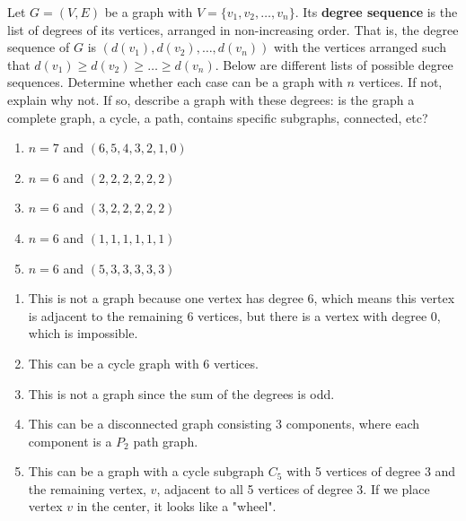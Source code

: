 \documentclass{article}
\theoremstyle{definition}
\begin{document}
\begin{question}
    Let $G=(V, E)$ be a graph with $V=\{v_1, v_2, \dots, v_n\}$. Its \textbf{degree sequence} is the list of degrees of its vertices, arranged in non-increasing order. That is, the degree sequence of $G$ is $(d(v_1), d(v_2), \dots, d(v_n))$ with the vertices arranged such that $d(v_1)\geq  d(v_2) \geq \dots \geq d(v_n)$. Below are different lists of possible degree sequences. Determine whether each case can be a graph with $n$ vertices. If not, explain why not. If so, describe a graph with these degrees: is the graph a complete graph, a cycle, a path, contains specific subgraphs, connected, etc?
\begin{enumerate}
	\item $n=7$ and $(6, 5, 4, 3, 2, 1, 0)$
	\item $n=6$ and $(2, 2, 2, 2, 2, 2)$
	\item $n=6$ and $(3, 2, 2, 2, 2, 2)$
	\item $n=6$ and $(1, 1, 1, 1, 1, 1)$
	\item $n=6$ and $(5, 3, 3, 3, 3, 3)$
	\end{enumerate}
\end{question}
\begin{solution}
\begin{enumerate}
	\item This is not a graph because one vertex has degree 6, which means this vertex is adjacent to the remaining 6 vertices, but there is a vertex with degree 0, which is impossible.
	\item This can be a cycle graph with 6 vertices.
	\item This is not a graph since the sum of the degrees is odd.
	\item This can be a disconnected graph consisting 3 components, where each component is a $P_2$ path graph.
	\item This can be a graph with a cycle subgraph $C_5$ with 5 vertices of degree 3 and the remaining vertex, $v$, adjacent to all 5 vertices of degree 3. If we place vertex $v$ in the center, it looks like a "wheel".
\end{enumerate}
\end{solution}
\end{document}

